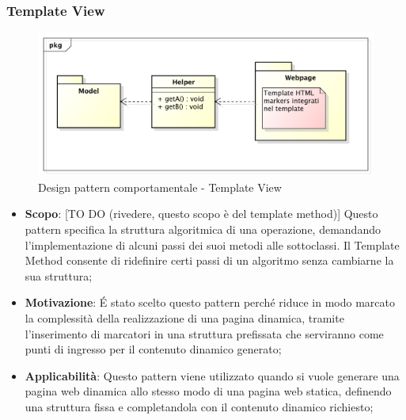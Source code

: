 		\newpage
		\subsubsection{Template View} %
		\begin{figure}[htbp]
			\centering
			\centerline{\includegraphics[scale=0.5]{./images/designpatternappendice/template_view.pdf}}
			\caption{Design pattern comportamentale - Template View}
		\end{figure}

		\begin{itemize}
			\item \textbf{Scopo}: [TO DO (rivedere, questo scopo è del template method)] Questo pattern specifica la struttura algoritmica di una operazione, demandando l'implementazione di alcuni passi dei suoi metodi alle sottoclassi. Il Template Method consente di ridefinire certi passi di un algoritmo senza cambiarne la sua struttura;
			\item \textbf{Motivazione}: \'E stato scelto questo pattern perché riduce in modo marcato la complessità della realizzazione di una pagina dinamica, tramite l'inserimento di marcatori in una struttura prefissata che serviranno come punti di ingresso per il contenuto dinamico generato;
			\item \textbf{Applicabilità}: Questo pattern viene utilizzato quando si vuole generare una pagina web dinamica allo stesso modo di una pagina web statica, definendo una struttura fissa e completandola con il contenuto dinamico richiesto;
		\end{itemize}

		\newpage
